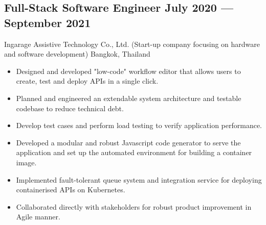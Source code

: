 \documentclass{article}
\newcommand{\subtext}[1]{
#1\par\vspace{-0.2cm}}
\newenvironment{zitemize}{
\begin{itemize}\itemsep0pt \parskip0pt \parsep1pt}
{\end{itemize}\vspace{-0.5cm}}
\begin{document}
        \subsection*{Full-Stack Software Engineer \hfill July 2020 --- September 2021}
        \subtext{Ingarage Assistive Technology Co., Ltd. {\scriptsize (Start-up company focusing on hardware and software development)} \hfill Bangkok, Thailand}
            \vspace{0.05cm}
            \begin{zitemize}
                \item Designed and developed "low-code" workflow editor that allows users to create, test and deploy APIs in a single click.
                \item Planned and engineered an extendable system architecture and testable codebase to reduce technical debt.
                \item Develop test cases and perform load testing to verify application performance.
                \item Developed a modular and robust Javascript code generator to serve the application and set up the automated environment for building a container image.
                \item Implemented fault-tolerant queue system and integration service for deploying containerised APIs on Kubernetes.
                \item Collaborated directly with stakeholders for robust product improvement in Agile manner.
            \end{zitemize}


\end{document}
